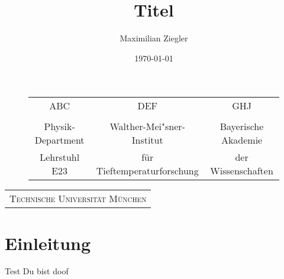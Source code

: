 \documentclass[a4paper, 10pt]{scrreprt}
\author{Maximilian Ziegler}
\title{Titel}
\date{\today}
\begin{document}
\begin{titlepage}
\clearpage \thispagestyle{empty} \setcounter{page}{0}

\begin{center}
\begin{figure}[h]
\centering
\begin{tabular}{ccc}
        ABC	&	DEF	&	GHJ \\
        &&\\
    \large{Physik-Department}&
    \large{Walther-Mei"sner-Institut}&
    \large{Bayerische Akademie}\\
    \large{Lehrstuhl E23}&
    \large{für Tieftemperaturforschung}&
    \large{der Wissenschaften}
\end{tabular}
\end{figure}
\vspace{1.5cm}

%



%
\begin{tabular}{c}

    \textsc{\Large{Technische Universität München}}%
\end{tabular}
\end{center}
\end{titlepage}
%
\clearpage \thispagestyle{empty} \setcounter{page}{0}
\newpage \thispagestyle{empty}
\tableofcontents
\newpage

\chapter{Einleitung}
\label{cha:Einleitung}

Test Du bist doof
\end{document}
